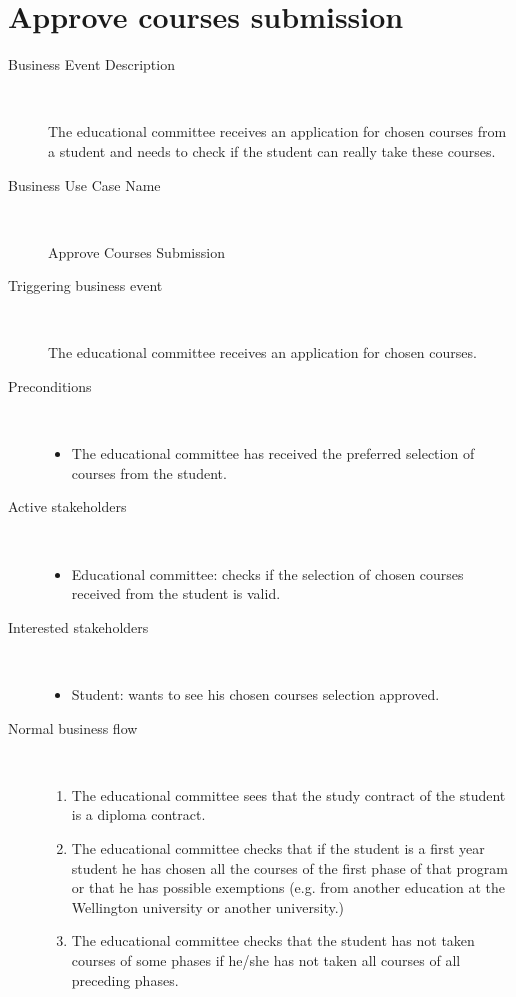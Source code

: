 \section{Approve courses submission}
\begin{description}
	\item[Business Event Description] \ 
		\par The educational committee receives an application for chosen courses from
		a student and needs to check if the student can really take these courses.
	\item[Business Use Case Name] \ 
		\par Approve Courses Submission
	\item[Triggering business event] \ 
		\par The educational committee receives an application for chosen courses.
	\item[Preconditions] \
	\begin{itemize}
		\item The educational committee has received the preferred selection of
		courses from the student.
	\end{itemize}
	\item[Active stakeholders] \ 
	\begin{itemize}
		\item Educational committee: checks if the selection of chosen courses
		received from the student is valid.
	\end{itemize}
	\item[Interested stakeholders] \ 
		\begin{itemize}		
		\item Student: wants to see his chosen courses selection approved.
		\end{itemize}
	\item[Normal business flow] \ 
	\begin{enumerate}
	  	\item The educational committee sees that the study contract of the student
	  	is a diploma contract.
	  	\item The educational committee checks that if the student is a first year
	  	student he has chosen all the courses of the first phase of that program or
	  	that he has possible exemptions (e.g. from another education at the
	  	Wellington university or another university.)
	  	\item The educational committee checks that the student has not taken courses 
	  	of some phases if he/she has not taken all courses of all preceding phases.

\end{enumerate}
\end{description}
